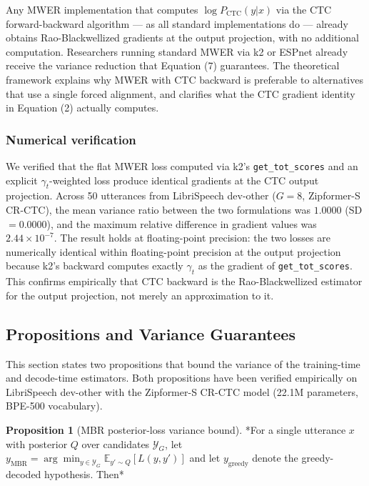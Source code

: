 Any MWER implementation that computes $\log P_\text{CTC}(y|x)$ via the CTC forward-backward algorithm — as all standard implementations do \cite{prabhavalkar2018mwer} — already obtains Rao-Blackwellized gradients at the output projection, with no additional computation. Researchers running standard MWER via k2 or ESPnet already receive the variance reduction that Equation (7) guarantees. The theoretical framework explains why MWER with CTC backward is preferable to alternatives that use a single forced alignment, and clarifies what the CTC gradient identity in Equation (2) actually computes.

\subsubsection{Numerical verification}

We verified that the flat MWER loss computed via k2's \texttt{get\_tot\_scores} and an explicit $\gamma_t$-weighted loss produce identical gradients at the CTC output projection. Across 50 utterances from LibriSpeech dev-other ($G=8$, Zipformer-S CR-CTC), the mean variance ratio between the two formulations was $1.0000$ (SD $= 0.0000$), and the maximum relative difference in gradient values was $2.44 \times 10^{-7}$. The result holds at floating-point precision: the two losses are numerically identical within floating-point precision at the output projection because k2's backward computes exactly $\gamma_t$ as the gradient of \texttt{get\_tot\_scores}. This confirms empirically that CTC backward is the Rao-Blackwellized estimator for the output projection, not merely an approximation to it.



\subsection{Propositions and Variance Guarantees}

This section states two propositions that bound the variance of the training-time and decode-time estimators. Both propositions have been verified empirically on LibriSpeech dev-other with the Zipformer-S CR-CTC model (22.1M parameters, BPE-500 vocabulary).

\textbf{Proposition 1} (MBR posterior-loss variance bound). *For a single utterance $x$ with posterior $Q$ over candidates $\mathcal{Y}_G$, let $y_\text{MBR} = \arg\min_{y \in \mathcal{Y}_G} \mathbb{E}_{y' \sim Q}[L(y, y')]$ and let $y_\text{greedy}$ denote the greedy-decoded hypothesis. Then*

